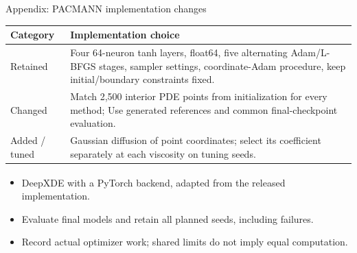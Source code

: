\documentclass[aspectratio=169,11pt]{beamer}
\begin{document}
\begin{frame}[noframenumbering]{Appendix: PACMANN implementation changes}
  \small
  \begin{tabular}{@{}p{}p{}@{}}
    \toprule
    Category & Implementation choice \\
    \midrule
    Retained & Four 64-neuron tanh layers, float64, five alternating Adam/L-BFGS
      stages, sampler settings, coordinate-Adam procedure, keep initial/boundary constraints fixed. \\
    Changed & Match 2,500 interior PDE points from initialization for every
      method;  Use generated references
      and common final-checkpoint evaluation. \\
    Added / tuned & Gaussian diffusion of point coordinates; select its
      coefficient separately at each viscosity on tuning seeds. \\
    \bottomrule
  \end{tabular}
  \medskip
  \begin{itemize}
    \item DeepXDE\textsuperscript{\cite{deepxde}} with a PyTorch backend,
      adapted from the released implementation.
    \item Evaluate final models and retain all planned seeds, including failures.
    \item Record actual optimizer work; shared limits do not imply equal computation.
  \end{itemize}
\end{frame}
\end{document}
